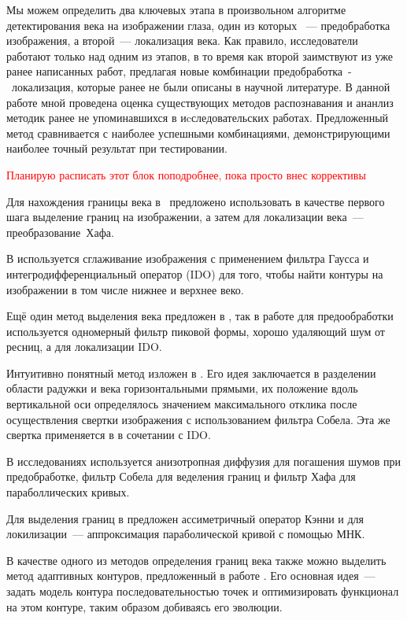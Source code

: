 \documentclass[12pt]{article} %
\begin{document}
Мы можем определить два ключевых этапа в произвольном алгоритме детектирования века на изображении глаза, один из которых ~--- предобработка изображения, а второй~--- локализация века. Как правило, исследователи работают только над одним из этапов, в то время как второй заимствуют из уже ранее написанных работ, предлагая новые комбинации предобработка~-~локализация, которые ранее не были описаны в научной литературе. В данной работе мной проведена оценка существующих методов распознавания и ананлиз методик ранее не упоминавшихся в иcследовательских работах. Предложенный метод сравнивается с наиболее успешными комбинациями, демонстрирующими наиболее точный результат при тестировании.

\textcolor{red}{Планирую расписать этот блок поподробнее, пока просто внес коррективы}

Для нахождения границы века в~\cite{Wildes} предложено использовать в качестве первого шага выделение границ на изображении, а затем для локализации века~--- преобразование~Хафа. 

В \cite{Daugman} используется сглаживание изображения с применением фильтра Гаусса и интегродифференциальный оператор
(IDO) для того, чтобы найти контуры на изображении в том числе нижнее и верхнее веко.

Ещё один метод выделения века предложен в \cite{KKX}, так в работе для предообработки используется одномерный фильтр пиковой формы, хорошо удаляющий шум от ресниц, а для локализации IDO.

Интуитивно понятный метод изложен в \cite{Masek}. Его идея заключается в разделении области радужки и века горизонтальными прямыми, их положение вдоль вертикальной оси определялось значением максимального отклика после осуществления свертки изображения с использованием фильтра Собела. Эта же свертка применяется в \cite{KP} в сочетании с IDO. 

В исследованиях \cite{Adam_2, Adam_1} используется анизотропная диффузия для погашения шумов при предобработке, фильтр Собела для веделения границ и фильтр Хафа для параболлических кривых. 

Для выделения границ в \cite{Yang} предложен ассиметричный оператор Кэнни и для локилизации~--- аппроксимация параболической кривой с помощью МНК. 

В качестве одного из методов определения границ века также можно выделить метод адаптивных контуров, предложенный в работе \cite{Smirn}. Его основная идея~--- задать модель контура последовательностью точек и оптимизировать функционал на этом контуре, таким образом добиваясь его эволюции.
\end{document}
